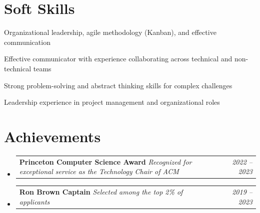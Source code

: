 \documentclass[a4paper,11pt]{article}
\makeatletter
\newcommand{\sectionspace}{\vspace{-0pt}}
\newcommand{\resAch}[3]{
\item
    \begin{tabular*}{0.97\textwidth}[t]{l@{\extracolsep{\fill}}r}
        \textbf{#1}\hspace{0.3mm} \textit{\footnotesize{#2}} & \textit{\small{#3}} 
    \end{tabular*}
    \vspace{-2mm} %
}
\newcommand{\smallbulletlabel}{$\vcenter{\hbox{\tiny$\bullet$}}$}
\newenvironment{resumeSubHeadingList}{\begin{itemize}[leftmargin=*,labelsep=1.2mm, label={}]}{\end{itemize}\vspace{2mm}} %
\newcommand{\bulletend}{}
\makeatother
\begin{document}
\section{\textbf{Soft Skills}}
\begin{itemize}[leftmargin=*, label=\smallbulletlabel, noitemsep]
    \small{
    \item {Organizational leadership, agile methodology (Kanban), and effective communication\bulletend} \\
    \item {Effective communicator with experience collaborating across technical and non-technical teams\bulletend} \\
    \item {Strong problem-solving and abstract thinking skills for complex challenges\bulletend} \\
    \item {Leadership experience in project management and organizational roles\bulletend} \\
    }
\end{itemize}
\sectionspace
\section{\textbf{Achievements}}
\begin{resumeSubHeadingList}
    \resAch{ Princeton Computer Science Award } %
    {Recognized for exceptional service as the Technology Chair of ACM\bulletend} %
    {2022 -- 2023} %
    \resAch{ Ron Brown Captain} %
    { Selected among the top 2\% of applicants\bulletend} %
    {2019 -- 2023} %
\end{resumeSubHeadingList}
\vspace{-5mm}%

\end{document}

